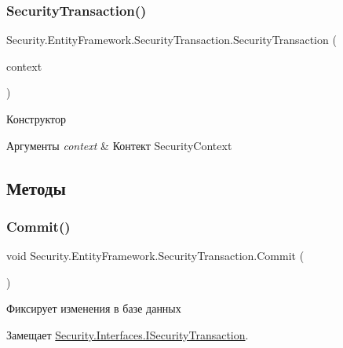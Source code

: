 \subsubsection{\texorpdfstring{Security\+Transaction()}{SecurityTransaction()}}
{\footnotesize\ttfamily Security.\+Entity\+Framework.\+Security\+Transaction.\+Security\+Transaction (\begin{DoxyParamCaption}\item[{\hyperlink{class_security_1_1_entity_dal_1_1_security_context}{Security\+Context}}]{context }\end{DoxyParamCaption})}



Конструктор 


\begin{DoxyParams}{Аргументы}
{\em context} & Контект Security\+Context\\
\hline
\end{DoxyParams}


\subsection{Методы}
\mbox{\label{class_security_1_1_entity_framework_1_1_security_transaction_a0878ace286c2f7459eecbc24331d0288}} 
\subsubsection{\texorpdfstring{Commit()}{Commit()}}
{\footnotesize\ttfamily void Security.\+Entity\+Framework.\+Security\+Transaction.\+Commit (\begin{DoxyParamCaption}{ }\end{DoxyParamCaption})}



Фиксирует изменения в базе данных 



Замещает \hyperlink{interface_security_1_1_interfaces_1_1_i_security_transaction_a8c845571091b59511114ba3fa0613525}{Security.\+Interfaces.\+I\+Security\+Transaction}.

\mbox{\label{class_security_1_1_entity_framework_1_1_security_transaction_ae89d12f6a50b38dc368e98dac4c9ee7f}} 
